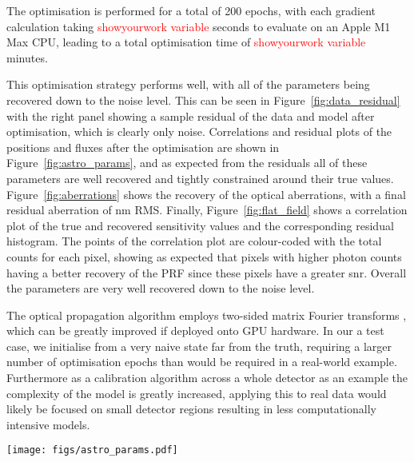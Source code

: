\documentclass[]{spieman}
\begin{document}
The optimisation is performed for a total of 200 epochs, with each gradient calculation taking \textcolor{red}{showyourwork variable} seconds to evaluate on an Apple M1 Max CPU, leading to a total optimisation time of \textcolor{red}{showyourwork variable} minutes.


This optimisation strategy performs well, with all of the parameters being recovered down to the noise level. This can be seen in Figure~\ref{fig:data_residual} with the right panel showing a sample residual of the data and model after optimisation, which is clearly only noise. Correlations and residual plots of the positions and fluxes after the optimisation are shown in Figure~\ref{fig:astro_params}, and as expected from the residuals all of these parameters are well recovered and tightly constrained around their true values. Figure~\ref{fig:aberrations} shows the recovery of the optical aberrations, with a final residual aberration of  nm RMS. Finally, Figure~\ref{fig:flat_field} shows a correlation plot of the true and recovered sensitivity values and the corresponding residual histogram. The points of the correlation plot are colour-coded with the total counts for each pixel, showing as expected that pixels with higher photon counts having a better recovery of the PRF since these pixels have a greater \ac{snr}. Overall the parameters are very well recovered down to the noise level.


The optical propagation algorithm employs two-sided matrix Fourier transforms \cite{Soummer2007}, which can be greatly improved if deployed onto GPU hardware. In our a test case, we initialise from a very naive state far from the truth, requiring a larger number of optimisation epochs than would be required in a real-world example. Furthermore as a calibration algorithm across a whole detector as an example the complexity of the model is greatly increased, applying this to real data would likely be focused on small detector regions resulting in less computationally intensive models.

\begin{figure*}
    \centering
    \texttt{[image: figs/astro\_params.pdf]}
    \caption{Left: recovery of the individual RA-Dec positions of each star, with the top section showing the correlation between the true and recovered values in units of arcseconds. The bottom section shows the individual residuals for each. Clearly these parameters have been well recovered through the optimisation. Right: the recovery of the flux parameters in units of photons. The top section shows the correlation between the true and recovered values, and the bottom showing the resulting residuals.}
    \label{fig:astro_params}
\end{figure*}
\end{document}
